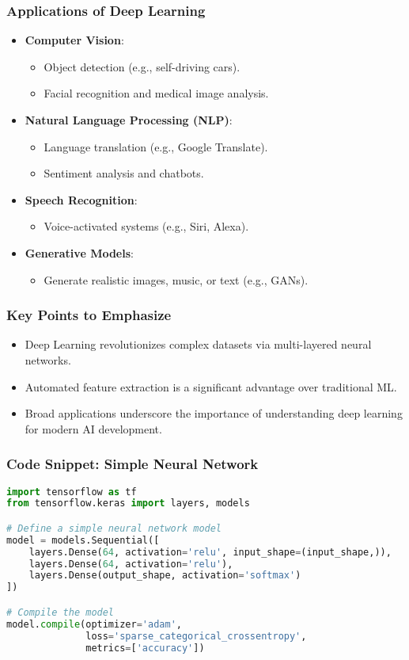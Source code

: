 \documentclass[aspectratio=169]{beamer}
\begin{document}
\begin{frame}
  \frametitle{Applications of Deep Learning}
  \begin{itemize}
    \item \textbf{Computer Vision}:
      \begin{itemize}
        \item Object detection (e.g., self-driving cars).
        \item Facial recognition and medical image analysis.
      \end{itemize}
    \item \textbf{Natural Language Processing (NLP)}:
      \begin{itemize}
        \item Language translation (e.g., Google Translate).
        \item Sentiment analysis and chatbots.
      \end{itemize}
    \item \textbf{Speech Recognition}:
      \begin{itemize}
        \item Voice-activated systems (e.g., Siri, Alexa).
      \end{itemize}
    \item \textbf{Generative Models}:
      \begin{itemize}
        \item Generate realistic images, music, or text (e.g., GANs).
      \end{itemize}
  \end{itemize}
\end{frame}

\begin{frame}
  \frametitle{Key Points to Emphasize}
  \begin{itemize}
    \item Deep Learning revolutionizes complex datasets via multi-layered neural networks.
    \item Automated feature extraction is a significant advantage over traditional ML.
    \item Broad applications underscore the importance of understanding deep learning for modern AI development.
  \end{itemize}
\end{frame}

\begin{frame}[fragile]
  \frametitle{Code Snippet: Simple Neural Network}
  \begin{lstlisting}[language=Python]
import tensorflow as tf
from tensorflow.keras import layers, models

# Define a simple neural network model
model = models.Sequential([
    layers.Dense(64, activation='relu', input_shape=(input_shape,)),
    layers.Dense(64, activation='relu'),
    layers.Dense(output_shape, activation='softmax')
])

# Compile the model
model.compile(optimizer='adam',
              loss='sparse_categorical_crossentropy',
              metrics=['accuracy'])
  \end{lstlisting}
\end{frame}
\end{document}
